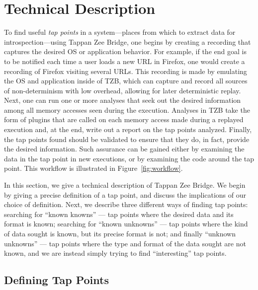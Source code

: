 \section{Technical Description}
\label{sec:technical}

To find useful \emph{tap points} in a system---places from which to
extract data for introspection---using Tappan Zee Bridge, one begins by
creating a recording that captures the desired OS or application
behavior. For example, if the end goal is to be notified each time a
user loads a new URL in Firefox, one would create a recording of Firefox
visiting several URLs. This recording is made by emulating the OS and
application inside of TZB, which can capture and record all sources of
non-determinism with low overhead, allowing for later deterministic
replay. Next, one can run one or more analyses that seek out the desired
information among all memory accesses seen during the execution.
Analyses in TZB take the form of plugins that are called on each memory
access made during a replayed execution and, at the end, write out a
report on the tap points analyzed. Finally, the tap points found should
be validated to ensure that they do, in fact, provide the desired
information. Such assurance can be gained either by examining the data
in the tap point in new executions, or by examining the code around the
tap point. This workflow is illustrated in Figure~\ref{fig:workflow}.

In this section, we give a technical description of Tappan Zee Bridge.
We begin by giving a precise definition of a tap point, and discuss the
implications of our choice of definition. Next, we describe three
different ways of finding tap points: searching for ``known knowns'' ---
tap points where the desired data and its format is known; searching for
``known unknowns'' --- tap points where the kind of data sought is known,
but its precise format is not; and finally ``unknown unknowns'' --- tap
points where the type and format of the data sought are not known, and
we are instead simply trying to find ``interesting'' tap points.

\subsection{Defining Tap Points}
\label{sec:technical:subsec:tapdef}

